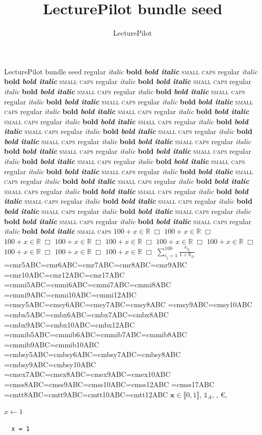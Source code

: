 \documentclass[notes=hide,10pt,mathserif,compress,aspectratio=169]{beamer}
\title{LecturePilot bundle seed}
\author{LecturePilot}
\newcommand{\seedstyles}{regular {\itshape italic} {\bfseries bold}
  {\bfseries\itshape bold italic} {\scshape small caps}}
\newcommand{\seedfamily}[1]{%
  {#1\tiny\seedstyles} {#1\scriptsize\seedstyles}
  {#1\footnotesize\seedstyles} {#1\small\seedstyles}
  {#1\normalsize\seedstyles} {#1\large\seedstyles}
  {#1\Large\seedstyles} {#1\LARGE\seedstyles}
  {#1\huge\seedstyles} {#1\Huge\seedstyles}}
\newcommand{\seedtfm}[1]{{\font\seedfont=#1\seedfont ABC}}
\begin{document}
\begin{frame}
  \titlepage
\end{frame}
\begin{frame}[fragile]{LecturePilot bundle seed}
  \seedfamily{\sffamily}
  \seedfamily{\rmfamily}
  \seedfamily{\ttfamily}
  {\tiny $100+x\in\mathbb{R}\;\Box$} {\scriptsize $100+x\in\mathbb{R}\;\Box$}
  {\footnotesize $100+x\in\mathbb{R}\;\Box$} {\small $100+x\in\mathbb{R}\;\Box$}
  {\normalsize $100+x\in\mathbb{R}\;\Box$} {\large $100+x\in\mathbb{R}\;\Box$}
  {\Large $100+x\in\mathbb{R}\;\Box$} {\LARGE $100+x\in\mathbb{R}\;\Box$}
  {\huge $100+x\in\mathbb{R}\;\Box$} {\Huge $100+x\in\mathbb{R}\;\Box$}
  $\displaystyle \sum_{i_j=1}^{100} \frac{x_{y_z}}{1+\mathbb{R}_{k_\ell}}$
  \seedtfm{cmr5}\seedtfm{cmr6}\seedtfm{cmr7}\seedtfm{cmr8}\seedtfm{cmr9}
  \seedtfm{cmr10}\seedtfm{cmr12}\seedtfm{cmr17}
  \seedtfm{cmmi5}\seedtfm{cmmi6}\seedtfm{cmmi7}\seedtfm{cmmi8}
  \seedtfm{cmmi9}\seedtfm{cmmi10}\seedtfm{cmmi12}
  \seedtfm{cmsy5}\seedtfm{cmsy6}\seedtfm{cmsy7}\seedtfm{cmsy8}
  \seedtfm{cmsy9}\seedtfm{cmsy10}
  \seedtfm{cmbx5}\seedtfm{cmbx6}\seedtfm{cmbx7}\seedtfm{cmbx8}
  \seedtfm{cmbx9}\seedtfm{cmbx10}\seedtfm{cmbx12}
  \seedtfm{cmmib5}\seedtfm{cmmib6}\seedtfm{cmmib7}\seedtfm{cmmib8}
  \seedtfm{cmmib9}\seedtfm{cmmib10}
  \seedtfm{cmbsy5}\seedtfm{cmbsy6}\seedtfm{cmbsy7}\seedtfm{cmbsy8}
  \seedtfm{cmbsy9}\seedtfm{cmbsy10}
  \seedtfm{cmex7}\seedtfm{cmex8}\seedtfm{cmex9}\seedtfm{cmex10}
  \seedtfm{cmss8}\seedtfm{cmss9}\seedtfm{cmss10}\seedtfm{cmss12}
  \seedtfm{cmss17}
  \seedtfm{cmtt8}\seedtfm{cmtt9}\seedtfm{cmtt10}\seedtfm{cmtt12}
  $\bm{x} \in \llbracket 0,1 \rrbracket$, $\mathds{1}_{A}$,
  , \euro, 
  \begin{algorithmic}
    \State $x \gets 1$
  \end{algorithmic}
  \lstset{language=Python}
  \begin{lstlisting}
  x = 1
  \end{lstlisting}
\end{frame}
\end{document}
